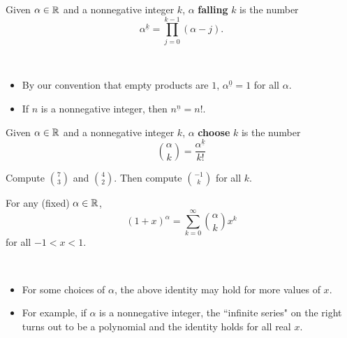 

\begin{definition}
Given $\alpha\in\mathbb R$ and a nonnegative integer $k$, $\alpha$ \textbf{falling} $k$ is the number
\begin{equation*}
\alpha^{\underline{k}} = \prod_{j=0}^{k-1}(\alpha-j).
\end{equation*}
\end{definition}
\begin{remark}\,
\begin{itemize}
\item By our convention that empty products are $1$, $\alpha^{\underline{0}}=1$ for all $\alpha$.
\item If $n$ is a nonnegative integer, then $n^{\underline{n}}=n!$.
\end{itemize}
\end{remark}


\begin{definition}
Given $\alpha\in\mathbb R$ and a nonnegative integer $k$, $\alpha$ \textbf{choose} $k$ is the number
\begin{equation*}
\binom{\alpha}{k} = \frac{\alpha^{\underline{k}}}{k!}
\end{equation*}
\end{definition}

\begin{example}
Compute $\binom{7}{3}$ and $\binom{4}{2}$.
Then compute $\binom{-1}{k}$ for all $k$.
\end{example}
\ifdefined\SOLUTION
{} 
\fi
\newpage

\begin{theorem}
For any (fixed) $\alpha\in\mathbb R$,
\begin{equation*}
(1+x)^\alpha = \sum_{k=0}^\infty\binom{\alpha}{k}x^k
\end{equation*}
for all $-1< x< 1$.
\end{theorem}
\begin{remark}\,
\begin{itemize}
\item For some choices of $\alpha$, the above identity may hold for more values of $x$.
\item For example, if $\alpha$ is a nonnegative integer, the ``infinite series" on the right turns out to be a polynomial and the identity holds for all real $x$.
\end{itemize}
\end{remark}

